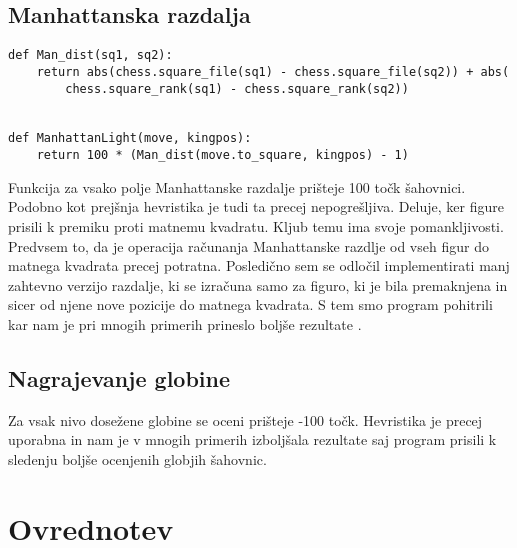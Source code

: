 \documentclass[runningheads]{llncs}
\begin{document}
\subsection{Manhattanska razdalja}
\begin{lstlisting}
def Man_dist(sq1, sq2):
    return abs(chess.square_file(sq1) - chess.square_file(sq2)) + abs(
        chess.square_rank(sq1) - chess.square_rank(sq2))


def ManhattanLight(move, kingpos):
    return 100 * (Man_dist(move.to_square, kingpos) - 1)
\end{lstlisting}
Funkcija za vsako polje Manhattanske razdalje prišteje 100 točk šahovnici. Podobno kot prejšnja hevristika je tudi ta precej nepogrešljiva. Deluje, ker figure prisili k premiku proti matnemu kvadratu. Kljub temu ima svoje pomankljivosti. Predvsem to, da je operacija računanja Manhattanske razdlje od vseh figur do matnega kvadrata precej potratna. Posledično sem se odločil implementirati manj zahtevno verzijo razdalje, ki se izračuna samo za figuro, ki je bila premaknjena in sicer od njene nove pozicije do matnega kvadrata. S tem smo program pohitrili kar nam je pri mnogih primerih prineslo boljše rezultate \cite{janko2015razvoj}.
\\
\subsection{Nagrajevanje globine}
Za vsak nivo dosežene globine se oceni prišteje -100 točk. Hevristika je precej uporabna in nam je v mnogih primerih izboljšala rezultate saj program prisili k sledenju boljše ocenjenih globjih šahovnic.

\section{Ovrednotev}


 
\setlength{\arrayrulewidth}{1mm}
\setlength{\tabcolsep}{18pt}
\renewcommand{\arraystretch}{2.5}
 
\end{document}

